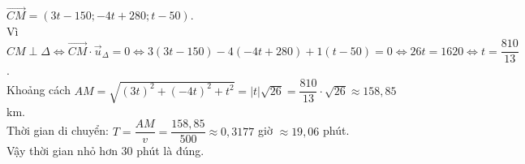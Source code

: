 \begin{ex}
{\begin{itemchoice}
			$\overrightarrow{CM} = (3t-150; -4t+280; t-50)$.\\
			Vì $CM \perp \Delta \Leftrightarrow \overrightarrow{CM} \cdot \vec{u}_{\Delta} = 0 \Leftrightarrow 3(3t-150) - 4(-4t+280) + 1(t-50) = 0 \Leftrightarrow 26t = 1620 \Leftrightarrow t = \dfrac{810}{13}$.\\
			Khoảng cách $AM = \sqrt{(3t)^2 + (-4t)^2 + t^2} = |t|\sqrt{26} = \dfrac{810}{13} \cdot \sqrt{26} \approx 158{,}85$ km.\\
			Thời gian di chuyển: $T = \dfrac{AM}{v} = \dfrac{158{,}85}{500} \approx 0{,}3177$ giờ $\approx 19{,}06$ phút.\\
			Vậy thời gian nhỏ hơn $30$ phút là đúng.
		\end{itemchoice}
	}
\end{ex}





